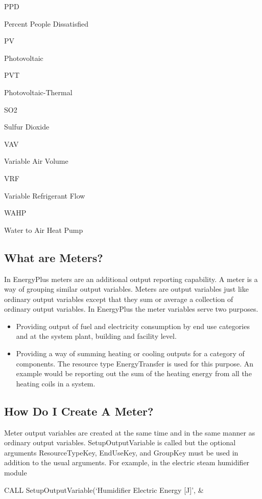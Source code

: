 PPD

Percent People Dissatisfied

PV

Photovoltaic

PVT

Photovoltaic-Thermal

SO2

Sulfur Dioxide

VAV

Variable Air Volume

VRF

Variable Refrigerant Flow

WAHP

Water to Air Heat Pump

\subsection{What are Meters?}\label{what-are-meters}

In EnergyPlus meters are an additional output reporting capability. A meter is a way of grouping similar output variables. Meters are output variables just like ordinary output variables except that they sum or average a collection of ordinary output variables. In EnergyPlus the meter variables serve two purposes.

\begin{itemize}
\item
  Providing output of fuel and electricity consumption by end use categories and at the system plant, building and facility level.
\item
  Providing a way of summing heating or cooling outputs for a category of components. The resource type EnergyTransfer is used for this purpose. An example would be reporting out the sum of the heating energy from all the heating coils in a system.
\end{itemize}

\subsection{How Do I Create A Meter?}\label{how-do-i-create-a-meter}

Meter output variables are created at the same time and in the same manner as ordinary output variables. SetupOutputVariable is called but the optional arguments ResourceTypeKey, EndUseKey, and GroupKey must be used in addition to the usual arguments. For example, in the electric steam humidifier module

CALL SetupOutputVariable(`Humidifier Electric Energy {[}J{]}', \&

